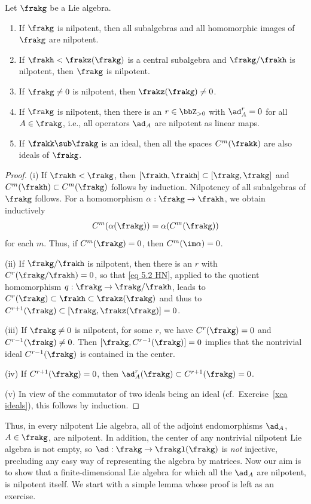 \begin{prop}[{\cite[Prop.~5.2.3]{HN}}]\label{prop 5.2.3 HN}
    Let $\frakg$ be a Lie algebra.
    \begin{enumerate}[label=(\roman*)]
        \item If $\frakg$ is nilpotent, then all subalgebras and all homomorphic images of $\frakg$ are nilpotent.
        \item If $\frakh<\frakz(\frakg)$ is a central subalgebra and $\frakg\slash\frakh$ is nilpotent, then $\frakg$ is nilpotent. 
        \item If $\frakg\neq 0$ is nilpotent, then $\frakz(\frakg)\neq 0$.
        \item If $\frakg$ is nilpotent, then there is an $r\in\bbZ_{>0}$ with $\ad_A^r=0$ for all $A\in\frakg$, i.e., all operators $\ad_A$ are nilpotent as linear maps.
        \item If $\frakk\sub \frakg$ is an ideal, then all the spaces $C^m(\frakk)$ are also ideals of $\frakg$.
    \end{enumerate}
\end{prop}
\begin{proof}
    (i) If $\frakh<\frakg$, then $[\frakh,\frakh]\subset [\frakg,\frakg]$ and $C^m(\frakh)\subset C^m(\frakg)$ follows by induction. Nilpotency of all subalgebras of $\frakg$ follows. For a homomorphism $\alpha:\frakg\to\frakh$, we obtain inductively 
    \[C^m(\alpha(\frakg))=\alpha(C^m(\frakg))\label{eq 5.2 HN}\]
     for each $m$. Thus, if $C^m(\frakg)=0$, then $C^m(\im\alpha)=0$.

    (ii) If $\frakg\slash\frakh$ is nilpotent, then there is an $r$ with $C^r(\frakg\slash\frakh)=0$, so that \eqref{eq 5.2 HN}, applied to the quotient homomorphism $q:\frakg\to\frakg\slash\frakh$, leads to $C^r(\frakg)\subset\frakh\subset\frakz(\frakg)$ and thus to $C^{r+1}(\frakg)\subset [\frakg,\frakz(\frakg)]=0$.

    (iii) If $\frakg\neq 0$ is nilpotent, for some $r$, we have $C^r(\frakg)=0$ and $C^{r-1}(\frakg)\neq 0$. Then $[\frakg,C^{r-1}(\frakg)]=0$ implies that the nontrivial ideal $C^{r-1}(\frakg)$ is contained in the center.

    (iv) If $C^{r+1}(\frakg)=0$, then $\ad_A^r(\frakg)\subset C^{r+1}(\frakg)=0$.

    (v) In view of the commutator of two ideals being an ideal (cf.\ Exercise~\ref{xca ideals}), this follows by induction.
\end{proof}

Thus, in every nilpotent Lie algebra, all of the adjoint endomorphisms $\ad_A$, $A\in\frakg$, are nilpotent. In addition, the center of any nontrivial nilpotent Lie algebra is not empty, so $\ad:\frakg\to\frakgl(\frakg)$ is \emph{not} injective, precluding any easy way of representing the algebra by matrices. Now our aim is to show that a finite-dimensional Lie algebra for which all the $\ad_A$ are nilpotent, is nilpotent itself. We start with a simple lemma whose proof is left as an exercise.


